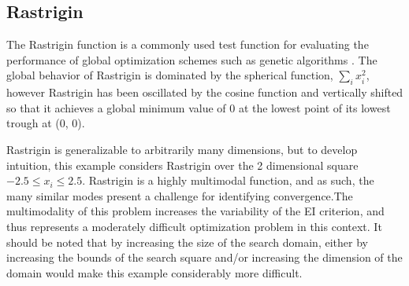 \documentclass{article}
\begin{document}
%
%
\subsection{Rastrigin}
%
%

%
The Rastrigin function is a commonly used test function for evaluating the 
performance of global optimization schemes such as genetic algorithms 
\citep{rastCite}. The global behavior of Rastrigin is dominated by the 
spherical function, $\sum_i x_i^2$, however Rastrigin has been oscillated by 
the cosine function and vertically shifted so that it achieves a global 
minimum value of 0 at the lowest point of its lowest trough at (0, 0).


%
Rastrigin is generalizable to arbitrarily many dimensions, but to develop 
intuition, this example considers Rastrigin over the 2 dimensional square 
$-2.5\le x_i\le 2.5$. Rastrigin is a highly multimodal function, and as such, 
the many similar modes present a challenge for identifying convergence.The 
multimodality of this problem increases the variability of the EI criterion, 
and thus represents a moderately difficult optimization problem in this 
context. It should be noted that by increasing the size of the search domain, 
either by increasing the bounds of the search square and/or increasing the 
dimension of the domain would make this example considerably more difficult. 
\end{document}
